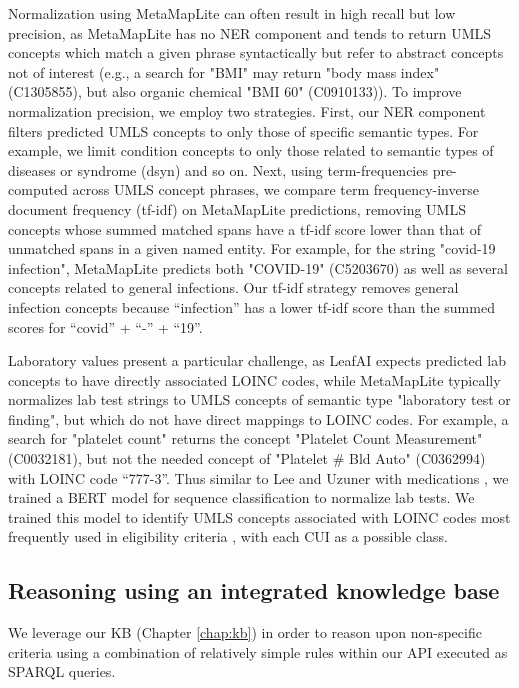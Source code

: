 \documentclass[../main.tex]{subfiles}
\begin{document}
Normalization using MetaMapLite can often result in high recall but low precision, as MetaMapLite has no NER component and tends to return UMLS concepts which match a given phrase syntactically but refer to abstract concepts not of interest (e.g., a search for "BMI" may return "body mass index" (C1305855), but also organic chemical "BMI 60" (C0910133)). To improve normalization precision, we employ two strategies. First, our NER component filters predicted UMLS concepts to only those of specific semantic types. For example, we limit condition concepts to only those related to semantic types of diseases or syndrome (dsyn) and so on. Next, using term-frequencies pre-computed across UMLS concept phrases, we compare term frequency-inverse document frequency (tf-idf) on MetaMapLite predictions, removing UMLS concepts whose summed matched spans have a tf-idf score lower than that of unmatched spans in a given named entity. For example, for the string "covid-19 infection", MetaMapLite predicts both "COVID-19" (C5203670) as well as several concepts related to general infections. Our tf-idf strategy removes general infection concepts because “infection” has a lower tf-idf score than the summed scores for “covid” + “-” + “19”. 

Laboratory values present a particular challenge, as LeafAI expects predicted lab concepts to have directly associated LOINC codes, while MetaMapLite typically normalizes lab test strings to UMLS concepts of semantic type "laboratory test or finding", but which do not have direct mappings to LOINC codes. For example, a search for "platelet count" returns the concept "Platelet Count Measurement" (C0032181), but not the needed concept of "Platelet \# Bld Auto" (C0362994) with LOINC code “777-3”. Thus similar to Lee and Uzuner with medications \cite{lee2020normalizing}, we trained a BERT model for sequence classification to normalize lab tests. We trained this model to identify UMLS concepts associated with LOINC codes most frequently used in eligibility criteria \cite{rafee2022elapro}, with each CUI as a possible class.

\subsection{Reasoning using an integrated knowledge base}

We leverage our KB (Chapter \ref{chap:kb}) in order to reason upon non-specific criteria using a combination of relatively simple rules within our API executed as SPARQL queries.
\end{document}
